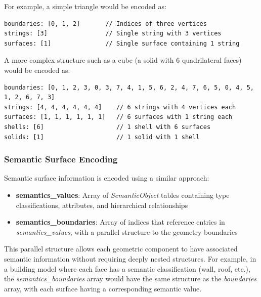 For example, a simple triangle would be encoded as:
\begin{lstlisting}[caption={Hierarchical boundary encoding for a simple triangle}, label={lst:triangle_encoding}, basicstyle=\small\ttfamily]
boundaries: [0, 1, 2]       // Indices of three vertices
strings: [3]                // Single string with 3 vertices
surfaces: [1]               // Single surface containing 1 string
\end{lstlisting}

A more complex structure such as a cube (a solid with 6 quadrilateral faces) would be encoded as:

\begin{lstlisting}[caption={Hierarchical boundary encoding for a cube structure}, label={lst:cube_encoding}, basicstyle=\small\ttfamily, breaklines=true]
boundaries: [0, 1, 2, 3, 0, 3, 7, 4, 1, 5, 6, 2, 4, 7, 6, 5, 0, 4, 5, 1, 2, 6, 7, 3]
strings: [4, 4, 4, 4, 4, 4]    // 6 strings with 4 vertices each
surfaces: [1, 1, 1, 1, 1, 1]   // 6 surfaces with 1 string each
shells: [6]                    // 1 shell with 6 surfaces
solids: [1]                    // 1 solid with 1 shell
\end{lstlisting}

\subsubsection{Semantic Surface Encoding}
\label{methodology:feature_encoding:geometry_encoding:semantics}

Semantic surface information is encoded using a similar approach:

\begin{itemize}
  \item \textbf{semantics\_values}: Array of \textit{SemanticObject} tables containing type classifications, attributes, and hierarchical relationships
  \item \textbf{semantics\_boundaries}: Array of indices that reference entries in \textit{semantics\_values}, with a parallel structure to the geometry boundaries
\end{itemize}

This parallel structure allows each geometric component to have associated semantic information without requiring deeply nested structures. For example, in a building model where each face has a semantic classification (wall, roof, etc.), the \textit{semantics\_boundaries} array would have the same structure as the \textit{boundaries} array, with each surface having a corresponding semantic value.

